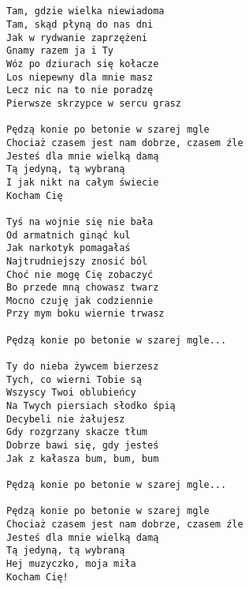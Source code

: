 \documentclass[12pt]{article}
\begin{document}
\subsection*{}
\begin{verbatim}
Tam, gdzie wielka niewiadoma
Tam, skąd płyną do nas dni
Jak w rydwanie zaprzężeni
Gnamy razem ja i Ty
Wóz po dziurach się kołacze
Los niepewny dla mnie masz
Lecz nic na to nie poradzę
Pierwsze skrzypce w sercu grasz

Pędzą konie po betonie w szarej mgle
Chociaż czasem jest nam dobrze, czasem źle
Jesteś dla mnie wielką damą
Tą jedyną, tą wybraną
I jak nikt na całym świecie
Kocham Cię

Tyś na wojnie się nie bała
Od armatnich ginąć kul
Jak narkotyk pomagałaś
Najtrudniejszy znosić ból
Choć nie mogę Cię zobaczyć
Bo przede mną chowasz twarz
Mocno czuję jak codziennie
Przy mym boku wiernie trwasz

Pędzą konie po betonie w szarej mgle...

Ty do nieba żywcem bierzesz
Tych, co wierni Tobie są
Wszyscy Twoi oblubieńcy
Na Twych piersiach słodko śpią
Decybeli nie żałujesz
Gdy rozgrzany skacze tłum
Dobrze bawi się, gdy jesteś
Jak z kałasza bum, bum, bum

Pędzą konie po betonie w szarej mgle...

Pędzą konie po betonie w szarej mgle
Chociaż czasem jest nam dobrze, czasem źle
Jesteś dla mnie wielką damą
Tą jedyną, tą wybraną
Hej muzyczko, moja miła
Kocham Cię!
\end{verbatim}
\clearpage
\end{document}
